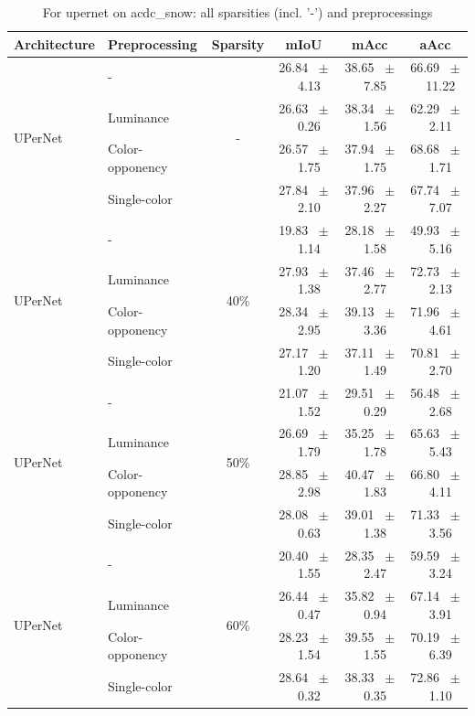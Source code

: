 \begin{table}[h]
  \centering
  \caption{For upernet on acdc_snow: all sparsities (incl. '-') and preprocessings}
  \begin{tabular}{@{}l l c c c c@{}}
    \toprule
    Architecture & Preprocessing & Sparsity & mIoU & mAcc & aAcc \\
    \midrule
    \multirow{4}{*}{UPerNet} & - & \multirow{4}{*}{-} & 26.84 ~$\pm$~ 4.13 & 38.65 ~$\pm$~ 7.85 & 66.69 ~$\pm$~ 11.22 \\
    & Luminance &  & 26.63 ~$\pm$~ 0.26 & 38.34 ~$\pm$~ 1.56 & 62.29 ~$\pm$~ 2.11 \\
    & Color-opponency &  & 26.57 ~$\pm$~ 1.75 & 37.94 ~$\pm$~ 1.75 & 68.68 ~$\pm$~ 1.71 \\
    & Single-color &  & 27.84 ~$\pm$~ 2.10 & 37.96 ~$\pm$~ 2.27 & 67.74 ~$\pm$~ 7.07 \\
    \midrule
    \multirow{4}{*}{UPerNet} & - & \multirow{4}{*}{40\%} & 19.83 ~$\pm$~ 1.14 & 28.18 ~$\pm$~ 1.58 & 49.93 ~$\pm$~ 5.16 \\
    & Luminance &  & 27.93 ~$\pm$~ 1.38 & 37.46 ~$\pm$~ 2.77 & 72.73 ~$\pm$~ 2.13 \\
    & Color-opponency &  & 28.34 ~$\pm$~ 2.95 & 39.13 ~$\pm$~ 3.36 & 71.96 ~$\pm$~ 4.61 \\
    & Single-color &  & 27.17 ~$\pm$~ 1.20 & 37.11 ~$\pm$~ 1.49 & 70.81 ~$\pm$~ 2.70 \\
    \midrule
    \multirow{4}{*}{UPerNet} & - & \multirow{4}{*}{50\%} & 21.07 ~$\pm$~ 1.52 & 29.51 ~$\pm$~ 0.29 & 56.48 ~$\pm$~ 2.68 \\
    & Luminance &  & 26.69 ~$\pm$~ 1.79 & 35.25 ~$\pm$~ 1.78 & 65.63 ~$\pm$~ 5.43 \\
    & Color-opponency &  & 28.85 ~$\pm$~ 2.98 & 40.47 ~$\pm$~ 1.83 & 66.80 ~$\pm$~ 4.11 \\
    & Single-color &  & 28.08 ~$\pm$~ 0.63 & 39.01 ~$\pm$~ 1.38 & 71.33 ~$\pm$~ 3.56 \\
    \midrule
    \multirow{4}{*}{UPerNet} & - & \multirow{4}{*}{60\%} & 20.40 ~$\pm$~ 1.55 & 28.35 ~$\pm$~ 2.47 & 59.59 ~$\pm$~ 3.24 \\
    & Luminance &  & 26.44 ~$\pm$~ 0.47 & 35.82 ~$\pm$~ 0.94 & 67.14 ~$\pm$~ 3.91 \\
    & Color-opponency &  & 28.23 ~$\pm$~ 1.54 & 39.55 ~$\pm$~ 1.55 & 70.19 ~$\pm$~ 6.39 \\
    & Single-color &  & 28.64 ~$\pm$~ 0.32 & 38.33 ~$\pm$~ 0.35 & 72.86 ~$\pm$~ 1.10 \\
    \midrule

\end{tabular}
\end{table}
